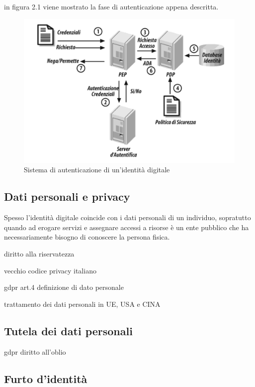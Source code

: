 in figura 2.1 viene mostrato la fase di autenticazione appena descritta.

\begin{figure}[ht]
	\begin{center}
		\includegraphics[width=320bp]{img/sistema_autenticazione.png}
		\caption{Sistema di autenticazione di un'identità digitale}
	\end{center}
\end{figure}

\subsection{Dati personali e privacy}
Spesso l'identità digitale coincide con i dati personali di un individuo, sopratutto quando ad erogare servizi e assegnare accessi a risorse è un ente pubblico che ha necessariamente bisogno di conoscere la persona fisica.

diritto alla riservatezza

vecchio codice privacy italiano

gdpr art.4 definizione di dato personale 

trattamento dei dati personali in UE, USA e CINA

\subsection{Tutela dei dati personali}
 gdpr diritto all'oblio
\subsection{Furto d'identità}

